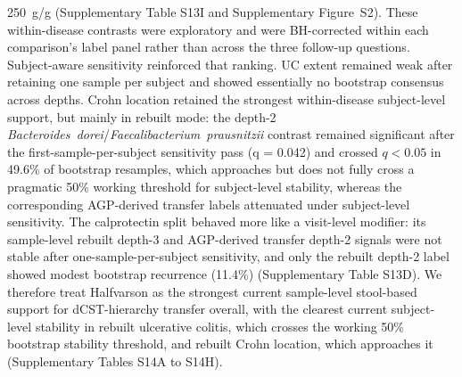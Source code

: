 \documentclass[
  11pt,
]{article}
\begin{document}
250~\textmu g/g (Supplementary Table S13I and Supplementary Figure~S2).
These within-disease contrasts were exploratory and were BH-corrected
within each comparison's label panel rather than across the three
follow-up questions.
Subject-aware sensitivity reinforced that ranking. UC extent remained
weak after retaining one sample per subject and showed essentially no
bootstrap consensus across depths. Crohn location retained the
strongest within-disease subject-level support, but mainly in rebuilt
mode: the depth-2
\emph{Bacteroides~dorei}/\emph{Faecalibacterium~prausnitzii}
contrast remained significant after the first-sample-per-subject
sensitivity pass (q = 0.042) and crossed \(q < 0.05\) in 49.6\% of
bootstrap resamples, which approaches but does not fully cross a
pragmatic 50\% working threshold for subject-level stability, whereas
the corresponding AGP-derived transfer labels attenuated under
subject-level sensitivity. The calprotectin split behaved more like a
visit-level modifier: its sample-level rebuilt depth-3 and AGP-derived
transfer depth-2 signals were not stable after
one-sample-per-subject sensitivity, and only the rebuilt depth-2 label
showed modest bootstrap recurrence (11.4\%) (Supplementary Table S13D).
We therefore treat Halfvarson as the strongest
current sample-level stool-based support for dCST-hierarchy transfer
overall, with the clearest current subject-level stability in
rebuilt ulcerative colitis, which crosses the working 50\% bootstrap
stability threshold, and rebuilt Crohn location, which approaches it
(Supplementary Tables S14A to S14H).
\end{document}
